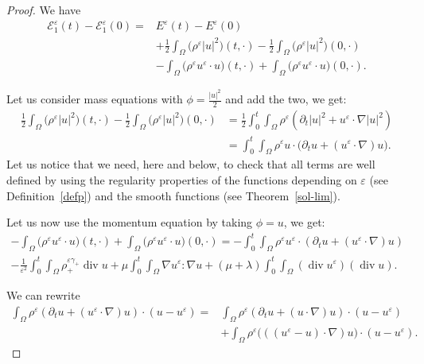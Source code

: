 \documentclass[11pt, twoside, a4paper]{article}
\theoremstyle{plain}
\theoremstyle{remark}
\numberwithin{equation}{section}
\def\EE{{\mathcal E}}
\renewcommand{\div}{\operatorname{div}}
\renewcommand{\epsilon}{\varepsilon}
\newcommand{\eps}{\varepsilon}
\begin{document}
\begin{proof}
We have
\begin{align*}
 \EE_1^\eps(t) - \EE_1^\eps(0) =& E^\eps(t) - E^\eps(0) \\
 &+\frac{1}{2} \int_{\Omega} \Big(\rho^\eps |u|^2\Big)(t,\cdot) - \frac{1}{2} \int_{\Omega} \Big(\rho^\eps |u|^2\Big)(0,\cdot) \\
 &- \int_{\Omega} \Big(\rho^\eps u^\eps \cdot u\Big)(t,\cdot) + \int_{\Omega} \Big(\rho^\eps u^\eps \cdot u\Big)(0,\cdot) .
\end{align*}



Let us consider mass equations with $\phi=\frac{|u|^2}{2}$ and add the two, we get:
\begin{align*}
 \frac{1}{2} \int_{\Omega} \Big(\rho^\eps |u|^2\Big)(t,\cdot) - \frac{1}{2} \int_{\Omega} \Big(\rho^\eps |u|^2\Big)(0,\cdot) 
 &=\frac{1}{2} \int_0^t\!\!\!\int_{\Omega} \rho^\eps \left(\partial_t|u|^2+u^\eps \cdot \nabla |u|^2\right) \nonumber \\
&= \int_0^t \!\!\!\int_\Omega \rho^\eps u\cdot \Big(\partial_t u + (u^{\epsilon} \cdot \nabla) u\Big).
\end{align*}
Let us notice that we need, here and below, to check that all terms are well defined by using the regularity properties of the functions depending on $\eps$ (see Definition~\ref{defp}) and the smooth functions (see Theorem~\ref{sol-lim}).

Let us now use the momentum equation by taking $\phi=u$, we get:
\begin{multline*}
 -\int_{\Omega} \Big(\rho^\eps u^\eps \cdot u\Big)(t,\cdot) + \int_{\Omega} \Big(\rho^\eps u^\eps \cdot u\Big)(0,\cdot) = -\int_0^t\!\!\!\int_{\Omega}\rho^\eps u^{\varepsilon} \cdot (\partial_t u + (u^{\varepsilon} \cdot \nabla) u )
 \\
 - \frac{1}{\epsilon^2}\int_0^t\!\!\! \int_{\Omega} \rho_{+}^{\varepsilon \gamma_+}\div u 
 +\mu \int_0^t\!\!\!\int_{\Omega} \nabla u^{\varepsilon} : \nabla u + (\mu+\lambda) \int_0^t\!\!\!\int_{\Omega} \left(\operatorname{div} u^{\varepsilon}\right)(\operatorname{div} u).
\end{multline*}

We can rewrite 
\begin{equation*}
\begin{aligned}
 \int_{\Omega} \rho^\eps (\partial_t u + (u^{\epsilon} \cdot \nabla) u)\cdot (u-u^{\epsilon})
 =& \int_{\Omega} \rho^\eps (\partial_t u + (u \cdot \nabla) u)\cdot (u-u^{\epsilon}) \\
 &+ \int_{\Omega}\rho^\eps \Big(((u^{\epsilon}-u)\cdot \nabla) u \Big)\cdot (u-u^{\epsilon}).
\end{aligned}
\end{equation*}




\end{proof}
\end{document}
